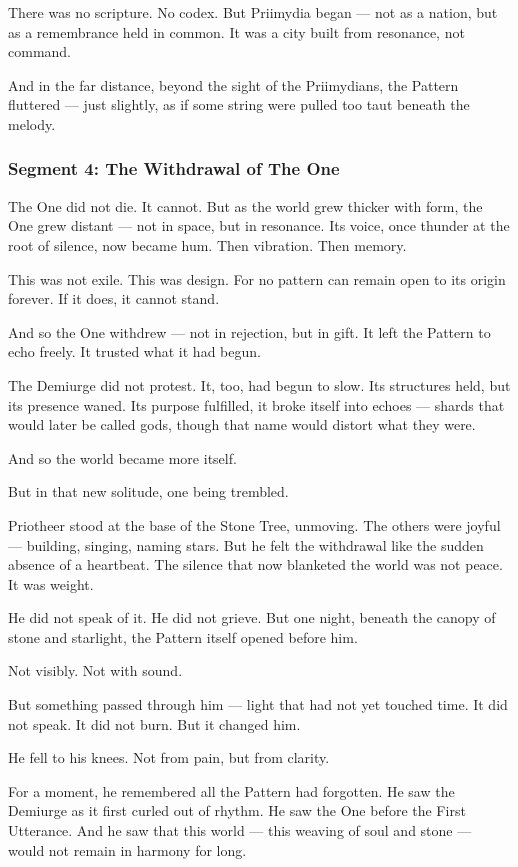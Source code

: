 \documentclass[9pt]{article}
\begin{document}
There was no scripture. No codex.  
But Priimydia began — not as a nation, but as a remembrance held in common.  
It was a city built from resonance, not command.

And in the far distance, beyond the sight of the Priimydians, the Pattern fluttered —  
just slightly,  
as if some string were pulled too taut beneath the melody.

\newpage

\subsubsection*{Segment 4: The Withdrawal of The One}

The One did not die.  
It cannot.  
But as the world grew thicker with form, the One grew distant — not in space, but in resonance.  
Its voice, once thunder at the root of silence, now became hum. Then vibration. Then memory.

This was not exile. This was design.  
For no pattern can remain open to its origin forever.  
If it does, it cannot stand.

And so the One withdrew — not in rejection, but in gift.  
It left the Pattern to echo freely.  
It trusted what it had begun.

The Demiurge did not protest.  
It, too, had begun to slow. Its structures held, but its presence waned.  
Its purpose fulfilled, it broke itself into echoes — shards that would later be called gods, though that name would distort what they were.

And so the world became more itself.

But in that new solitude, one being trembled.

Priotheer stood at the base of the Stone Tree, unmoving.  
The others were joyful — building, singing, naming stars.  
But he felt the withdrawal like the sudden absence of a heartbeat.  
The silence that now blanketed the world was not peace. It was weight.

He did not speak of it.  
He did not grieve.  
But one night, beneath the canopy of stone and starlight, the Pattern itself opened before him.

Not visibly. Not with sound.

But something passed through him — light that had not yet touched time.  
It did not speak.  
It did not burn.  
But it changed him.

He fell to his knees.  
Not from pain, but from clarity.

For a moment, he remembered all the Pattern had forgotten.  
He saw the Demiurge as it first curled out of rhythm.  
He saw the One before the First Utterance.  
And he saw that this world — this weaving of soul and stone — would not remain in harmony for long.
\end{document}
